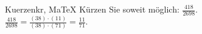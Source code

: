 \begin{MAufgabe}{Kuerzen}{kr, MaTeX}
K\"urzen Sie soweit m\"oglich: $\frac{418}{2698}$.\\ 
\ifLsg\MLoesung
\quad $\frac{418}{2698}=\frac{(38)\cdot(11)}{(38)\cdot(71)}=\frac{11}{71}$.\else\relax\fi
 \end{MAufgabe}